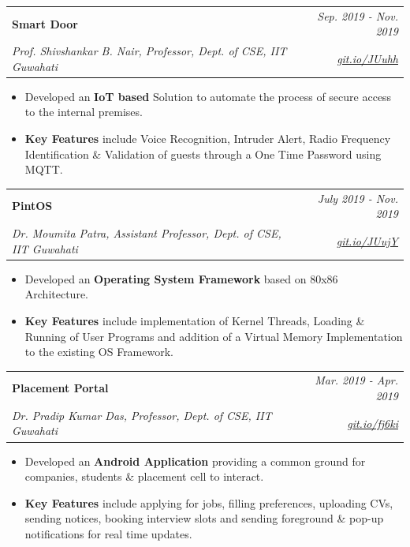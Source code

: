\documentclass[a4paper,11pt]{article}
\makeatletter
\newcommand{\resumeProject}[4]{
\vspace{0.5mm}\item
    \begin{tabular*}{0.98\textwidth}[t]{l@{\extracolsep{\fill}}r}
        \textbf{#1} & \textit{\footnotesize{#3}} \\
        \footnotesize{\textit{#2}} & \footnotesize{#4}
    \end{tabular*}
    \vspace{-2.4mm}
}
\newcommand{\resumeItemListStart}{\begin{justify}\begin{itemize}[leftmargin=6ex, rightmargin=2ex, noitemsep,labelsep=1.2mm,itemsep=0mm]\small}
\newcommand{\resumeItemListEnd}{\end{itemize}\end{justify}\vspace{-2mm}}
\makeatother
\begin{document}
    \resumeProject
      {Smart Door} %
      {Prof. Shivshankar B. Nair, Professor, Dept. of CSE, IIT Guwahati} %
      {Sep. 2019 - Nov. 2019} %
      {\href{https://github.com/AranyaAryaman/Peripherals-Lab/tree/master/Smart_door_project}{\textit{git.io/JUuhh}}} %
      \resumeItemListStart
      \vspace{0.5mm}
        \item {Developed an \textbf{IoT based} Solution to automate the process of  secure access to the internal premises.} 
        \vspace{0.5mm}
        \item{\textbf{Key Features} include Voice Recognition, Intruder Alert, Radio  Frequency Identification \& Validation of guests through a One Time Password using MQTT.}
    \resumeItemListEnd
     \resumeProject
       {PintOS}
       {Dr. Moumita Patra, Assistant Professor, Dept. of CSE, IIT Guwahati}{July 2019 - Nov. 2019}{\href{https://github.com/AranyaAryaman/pintos}{\textit{git.io/JUujY}}}
       \resumeItemListStart
       \vspace{0,5mm}
     \item {Developed an \textbf{Operating System Framework} based on 80x86 Architecture. }
     \vspace{0.5mm}
     \item {\textbf{Key Features} include implementation of Kernel Threads, Loading \& Running of User Programs and addition of a Virtual Memory Implementation to the existing OS Framework.}
    \resumeItemListEnd
    \resumeProject
      {Placement Portal} %
      {Dr. Pradip Kumar Das, Professor, Dept. of CSE, IIT Guwahati} %
      {Mar. 2019 - Apr. 2019} %
      {\href{https://github.com/AranyaAryaman/Placement_Portal}{\textit{git.io/fj6ki}}} %
      \resumeItemListStart
      \vspace{0.5mm}
        \item {Developed an \textbf{Android Application} providing a common ground for companies, students \& placement cell to interact.}
        \item{\textbf{Key Features} include applying for jobs, filling preferences, uploading CVs, sending notices, booking interview slots and sending foreground \& pop-up notifications for real time updates. }
    \resumeItemListEnd
\end{document}
